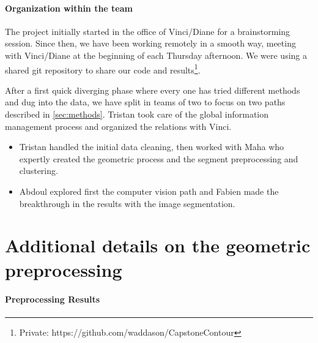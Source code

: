 \documentclass[11pt]{article}
\begin{document}
\paragraph{Organization within the team}
The project initially started in the office of Vinci/Diane for a brainstorming session.
Since then, we have been working remotely in a smooth way, meeting with 
Vinci/Diane at the beginning of each Thursday afternoon. We were using a shared 
git repository to share our code and results\footnote{Private: https://github.com/waddason/CapstoneContour}.

After a first quick diverging phase where every one has 
tried different methods and dug into the data,  we have split in teams of two 
to focus on two paths described in \cref{sec:methods}. Tristan took care of the global information management process and organized the
relations with Vinci.
\begin{itemize}
    \item Tristan handled the initial data cleaning, then worked with Maha who 
    expertly created the geometric process and the segment preprocessing and clustering.
    \item Abdoul explored first the computer vision path and Fabien made the 
    breakthrough in the results with the image segmentation.
\end{itemize}







\appendix

\newpage

\section{Additional details on the geometric preprocessing}
\label{app:sec:geomdetails}
\paragraph{Preprocessing Results}
\end{document}
